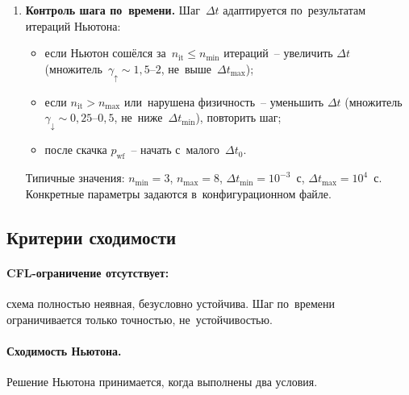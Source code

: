 \documentclass[12pt,a4paper]{article}
\newcommand{\pwf}{p_{\mathrm{wf}}}
\begin{document}
\begin{enumerate}[leftmargin=*, label=\textbf{Шаг \arabic*.}]
\item \textbf{Контроль шага по~времени.}
  Шаг~$\Delta t$ адаптируется по~результатам итераций Ньютона:
  \begin{itemize}[nosep]
    \item если Ньютон сошёлся за~$n_{\mathrm{it}} \leqslant n_{\min}$
          итераций~-- увеличить $\Delta t$ (множитель~$\gamma_{\uparrow}
          \sim 1{,}5$--$2$, не~выше~$\Delta t_{\max}$);
    \item если $n_{\mathrm{it}} > n_{\max}$ или~нарушена физичность~--
          уменьшить $\Delta t$ (множитель~$\gamma_{\downarrow}
          \sim 0{,}25$--$0{,}5$, не~ниже~$\Delta t_{\min}$),
          повторить шаг;
    \item после скачка $\pwf$~-- начать с~малого~$\Delta t_0$.
  \end{itemize}
  Типичные значения: $n_{\min} = 3$, $n_{\max} = 8$,
  $\Delta t_{\min} = 10^{-3}$~с, $\Delta t_{\max} = 10^4$~с.
  Конкретные параметры задаются в~конфигурационном файле.

\end{enumerate}


\subsection{Критерии сходимости}\label{ssec:convergence}

\paragraph{CFL-ограничение отсутствует:}
схема полностью неявная, безусловно устойчива. Шаг по~времени
ограничивается только точностью, не~устойчивостью.

\paragraph{Сходимость Ньютона.}
Решение Ньютона принимается, когда выполнены два условия.
\end{document}
